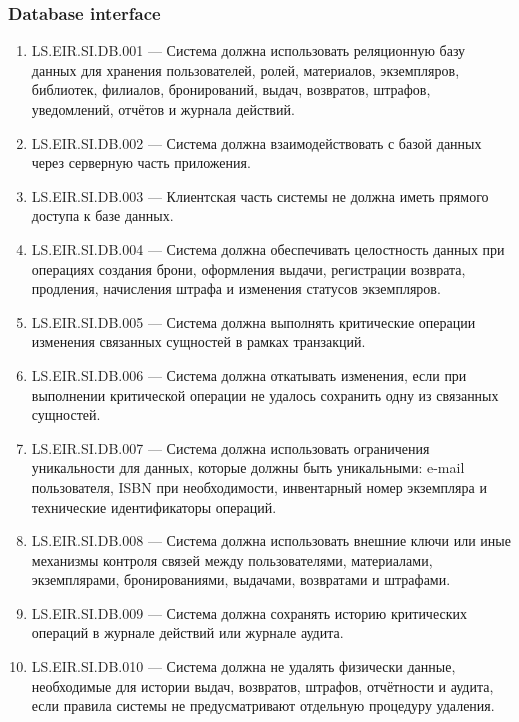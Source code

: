 \documentclass[12pt,a4paper]{article}
\begin{document}
	\subsubsection{Database interface}
	
	\begin{enumerate}
		\item LS.EIR.SI.DB.001 --- Система должна использовать реляционную базу данных
		для хранения пользователей, ролей, материалов, экземпляров, библиотек, филиалов,
		бронирований, выдач, возвратов, штрафов, уведомлений, отчётов и журнала действий.
		
		\item LS.EIR.SI.DB.002 --- Система должна взаимодействовать с базой данных через
		серверную часть приложения.
		
		\item LS.EIR.SI.DB.003 --- Клиентская часть системы не должна иметь прямого доступа
		к базе данных.
		
		\item LS.EIR.SI.DB.004 --- Система должна обеспечивать целостность данных при
		операциях создания брони, оформления выдачи, регистрации возврата, продления,
		начисления штрафа и изменения статусов экземпляров.
		
		\item LS.EIR.SI.DB.005 --- Система должна выполнять критические операции изменения
		связанных сущностей в рамках транзакций.
		
		\item LS.EIR.SI.DB.006 --- Система должна откатывать изменения, если при выполнении
		критической операции не удалось сохранить одну из связанных сущностей.
		
		\item LS.EIR.SI.DB.007 --- Система должна использовать ограничения уникальности
		для данных, которые должны быть уникальными: e-mail пользователя, ISBN при
		необходимости, инвентарный номер экземпляра и технические идентификаторы
		операций.
		
		\item LS.EIR.SI.DB.008 --- Система должна использовать внешние ключи или иные
		механизмы контроля связей между пользователями, материалами, экземплярами,
		бронированиями, выдачами, возвратами и штрафами.
		
		\item LS.EIR.SI.DB.009 --- Система должна сохранять историю критических операций
		в журнале действий или журнале аудита.
		
		\item LS.EIR.SI.DB.010 --- Система должна не удалять физически данные, необходимые
		для истории выдач, возвратов, штрафов, отчётности и аудита, если правила системы
		не предусматривают отдельную процедуру удаления.
	\end{enumerate}
	
\end{document}
